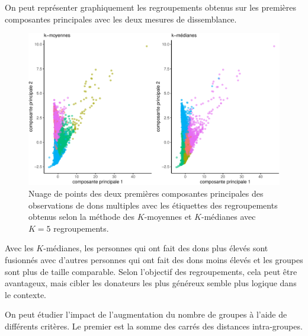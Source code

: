 \documentclass[
  11pt,
  letterpaper,
]{scrbook}
\newenvironment{Shaded}{\begin{snugshade}}{\end{snugshade}}
\newcommand{\CommentTok}[1]{\textcolor[rgb]{0.37,0.37,0.37}{#1}}
\newcommand{\ControlFlowTok}[1]{\textcolor[rgb]{0.00,0.23,0.31}{#1}}
\newcommand{\FunctionTok}[1]{\textcolor[rgb]{0.28,0.35,0.67}{#1}}
\newcommand{\NormalTok}[1]{\textcolor[rgb]{0.00,0.23,0.31}{#1}}
\newcommand{\OtherTok}[1]{\textcolor[rgb]{0.00,0.23,0.31}{#1}}
\newcommand{\SpecialCharTok}[1]{\textcolor[rgb]{0.37,0.37,0.37}{#1}}
\theoremstyle{definition}
\theoremstyle{remark}
\begin{document}
On peut représenter graphiquement les regroupements obtenus sur les
premières composantes principales avec les deux mesures de dissemblance.

\begin{figure}[ht!]

{\centering \includegraphics[width=1\textwidth,height=\textheight]{./03-regroupements_files/figure-pdf/fig-acpkmoy5-1.pdf}

}

\caption{\label{fig-acpkmoy5}Nuage de points des deux premières
composantes principales des observations de dons multiples avec les
étiquettes des regroupements obtenus selon la méthode des \(K\)-moyennes
et \(K\)-médianes avec \(K=5\) regroupements.}

\end{figure}

Avec les \(K\)-médianes, les personnes qui ont fait des dons plus élevés
sont fusionnés avec d'autres personnes qui ont fait des dons moins
élevés et les groupes sont plus de taille comparable. Selon l'objectif
des regroupements, cela peut être avantageux, mais cibler les donateurs
les plus généreux semble plus logique dans le contexte.

On peut étudier l'impact de l'augmentation du nombre de groupes à l'aide
de différents critères. Le premier est la somme des carrés des distances
intra-groupes.

\begin{Shaded}
\end{Shaded}
\end{document}
